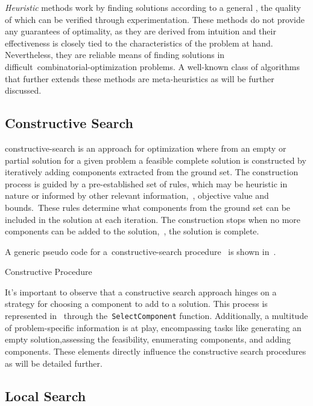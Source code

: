 \emph{Heuristic} methods work by finding solutions according to a general
, the quality of which can be verified through
experimentation. These methods do not provide any guarantees of optimality, as
they are derived from intuition and their effectiveness is closely tied to the
characteristics of the problem at hand. Nevertheless, they are reliable means of
finding solutions in difficult~\acrshort{combinatorial-optimization} problems. A
well-known class of algorithms that further extends these methods are meta-heuristics
as will be further discussed.

\subsection{Constructive Search}
\label{subsec:contructive-search}

\acrfull{constructive-search} is an approach for optimization where from an
empty or partial solution for a given problem a feasible complete solution is
constructed by iteratively adding components extracted from the ground set. The
construction process is guided by a pre-established set of rules, which may be
heuristic in nature or informed by other relevant information,~\eg{}, objective
value and bounds.~These rules determine what components from the ground set can
be included in the solution at each iteration. The construction stops when no
more components can be added to the solution,~\ie{}, the solution is complete.

A generic pseudo code for a~\acrshort{constructive-search}
procedure~\cite{marti2013multistart} is shown in~.

\begin{algorithm}
  \DontPrintSemicolon
  
  \caption{Constructive Procedure}
  \label{algorithm:cs}
\end{algorithm}

It's important to observe that a constructive search approach hinges on a
strategy for choosing a component to add to a solution. This process is
represented in~ through the~\texttt{SelectComponent}
function. Additionally, a multitude of problem-specific information is at play,
encompassing tasks like generating an empty solution,assessing the feasibility,
enumerating components, and adding components. These elements directly influence
the constructive search procedures as will be detailed further.

\subsection{Local Search}
\label{subsec:local-search}

